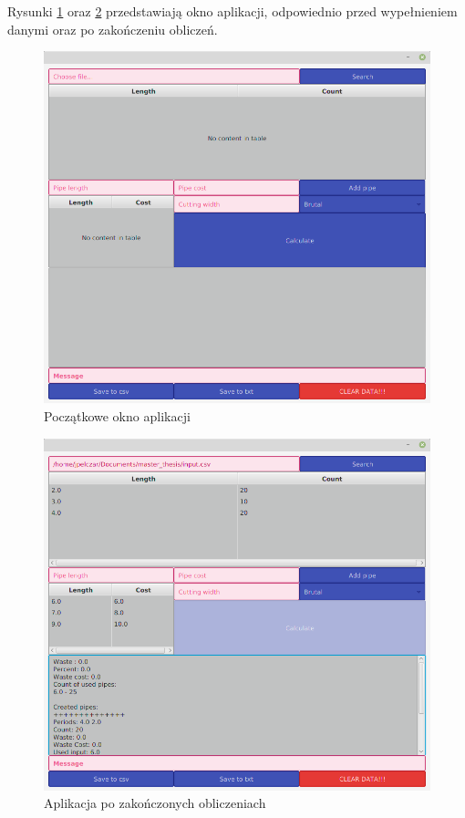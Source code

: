 Rysunki \ref{fig:empty_win} oraz \ref{fig:fill_win} przedstawiają okno aplikacji, odpowiednio przed wypełnieniem danymi oraz po zakończeniu obliczeń.

\begin{figure}[h]
  \center
  \includegraphics[scale=0.4]{../image/empty_win.png}
  \caption{Początkowe okno aplikacji}
  \label{fig:empty_win}
\end{figure}

\begin{figure}[h]
  \center
  \includegraphics[scale=0.4]{../image/fill_win.png}
  \caption{Aplikacja po zakończonych obliczeniach}
  \label{fig:fill_win}
\end{figure}

